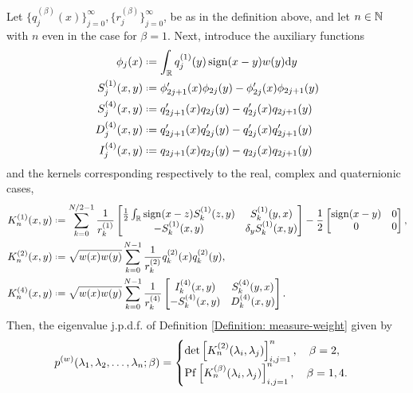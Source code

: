 \begin{teorema}
	Let $\{q_j^{(\beta)}(x)\}_{j=0}^{\infty}, \{r_j^{(\beta)}\}_{j=0}^{\infty}$, be as in the definition above, and let $n \in \mathbb{N}$ with $n$ even in the case for $\beta = 1$. Next, introduce the auxiliary functions
	\begin{align}
		\phi_j(x) & \deff \int_{\R} q_j^{(1)}(y) \sign(x-y) \wf(y) \dd y \\
		S_j^{(1)}(x,y) & \deff \phi'_{2j+1}(x)\phi_{2j}(y) - \phi'_{2j}(x)\phi_{2j+1}(y) \\
		S_j^{(4)}(x,y) & \deff q'_{2j+1}(x)q_{2j}(y) - q'_{2j}(x)q_{2j+1}(y) \\
		D_j^{(4)}(x,y) & \deff q'_{2j+1}(x)q'_{2j}(y) - q'_{2j}(x)q'_{2j+1}(y) \\
		I_j^{(4)}(x,y) & \deff q_{2j+1}(x)q_{2j}(y) - q_{2j}(x)q_{2j+1}(y)
	\end{align}
	and the kernels corresponding respectively to the real, complex and quaternionic cases,
	\begin{align}
		K_n^{(1)}(x,y) & \deff \sum_{k=0}^{N/2-1} \frac{1}{r_k^{(1)}} \begin{bmatrix}
			\frac{1}{2} \int_{\R} \sign(x-z) S_k^{(1)}(z,y) & S_k^{(1)}(y,x) \\
			-S_k^{(1)}(x,y) & \delta_y S_k^{(1)}(x,y)
		\end{bmatrix} 
		- \frac{1}{2} 
		\begin{bmatrix}
			\sign(x-y) & 0 \\
			0 & 0
		\end{bmatrix},   \\
		K_n^{(2)}(x,y) & \deff \sqrt{\wf(x) \wf(y)} \sum_{k=0}^{N-1} \frac{1}{r_k^{(2)}} q_k^{(2)}(x) q_k^{(2)}(y), \\
		K_n^{(4)}(x,y) & \deff \sqrt{\wf(x) \wf(y)} \sum_{k=0}^{N-1} \frac{1}{r_k^{(4)}}
		\begin{bmatrix}
			I_k^{(4)}(x,y) & S_k^{(4)}(y,x) \\
			-S_k^{(4)}(x,y) & D_k^{(4)}(x,y)
		\end{bmatrix}.
	\end{align}
	Then, the eigenvalue j.p.d.f. of Definition \ref{Definition: measure-weight} given by
	\begin{equation}
	p^{(w)}(\lambda_1, \lambda_2, \dots, \lambda_n;\beta) = 
	\begin{cases}
		\det\left[ K_n^{(2)}(\lambda_i, \lambda_j) \right]_{i,j=1}^{n}, \quad \beta = 2, \\
		\operatorname{Pf}\left[ K_n^{(\beta)}(\lambda_i, \lambda_j) \right]_{i,j=1}^{n}, \quad \beta = 1,4.
	\end{cases}
	\end{equation}
	\label{Theorem: Kernel}
\end{teorema}


